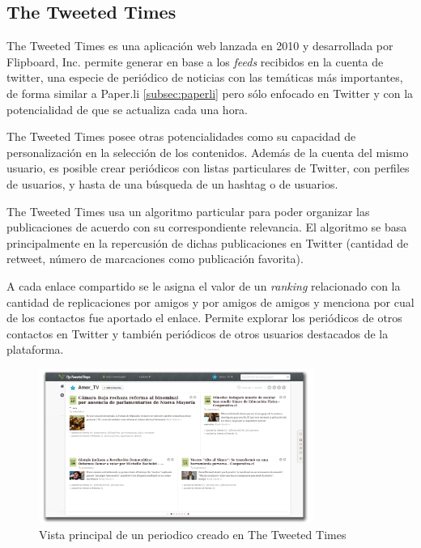 \subsection{The Tweeted Times}

The Tweeted Times \cite{tweetedtimes} es una aplicación web lanzada en 2010 y desarrollada por Flipboard, Inc. permite generar en base a los \emph{feeds} recibidos en la cuenta de twitter, una especie de periódico de noticias con las temáticas más importantes, de forma similar a Paper.li \ref{subsec:paperli} pero sólo enfocado en Twitter y con la potencialidad de que se actualiza cada una hora.

The Tweeted Times posee otras potencialidades como su capacidad de personalización en la selección de los contenidos.
Además de la cuenta del mismo usuario, es posible crear periódicos con listas particulares de Twitter, con perfiles de usuarios, y hasta de una búsqueda de un hashtag o de usuarios.

The Tweeted Times usa un algoritmo particular para poder organizar las publicaciones de acuerdo con su correspondiente relevancia. El algoritmo se basa principalmente en la repercusión de dichas publicaciones en Twitter (cantidad de retweet, número de marcaciones como publicación favorita).

A cada enlace compartido se le asigna el valor de un \emph{ranking} relacionado con la cantidad de replicaciones por amigos y por amigos de amigos y menciona por cual de los contactos fue aportado el enlace. Permite explorar los periódicos de otros contactos en Twitter y también periódicos de otros usuarios destacados de la plataforma.

\begin{figure}[H]
	\centering
	\includegraphics[width=0.8\textwidth]{imgs/tweettimes.png}
	\caption{Vista principal de un periodico creado en The Tweeted Times}
	\label{fig:tweetedTime}
\end{figure}

